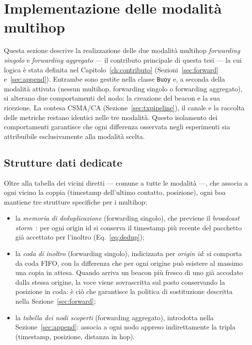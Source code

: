 \section{Implementazione delle modalit\`a multihop}
\label{sec:multihop-impl}
Questa sezione descrive la realizzazione delle due modalit\`a multihop \emph{forwarding singolo} e
\emph{forwarding aggregato} --- il contributo principale di questa tesi --- la cui logica
\`e stata definita nel Capitolo~\ref{ch:contributo} (Sezioni~\ref{sec:forward}
e~\ref{sec:append}). Entrambe sono gestite nella classe \texttt{Buoy} e, a seconda della modalit\`a attivata
(nessun multihop, forwarding singolo o forwarding aggregato),
si alterano due comportamenti del nodo: la creazione del beacon
e la sua ricezione. La contesa CSMA/CA
(Sezione~\ref{sec:txpipeline}), il canale e la raccolta delle metriche restano
identici nelle tre modalit\`a. Questo isolamento dei comportamenti garantisce che 
ogni differenza osservata negli esperimenti sia attribuibile esclusivamente
alla modalit\`a scelta.

\subsection{Strutture dati dedicate}
\label{sec:multihop-state}
Oltre alla tabella dei vicini diretti --- comune a tutte le
modalit\`a ---, che associa a ogni vicino la coppia (timestamp dell'ultimo contatto,
posizione), ogni boa mantiene tre strutture specifiche per i multihop:
\begin{itemize}[leftmargin=1.4em,nosep]
  \item la \emph{memoria di deduplicazione} (forwarding singolo), che previene il \emph{broadcast storm}~\cite{broadcaststorm}: per
  ogni origin id si conserva il timestamp pi\`u recente del pacchetto gi\`a accettato per l'inoltro (Eq.~\ref{eq:dedup});
  \item la \emph{coda di inoltro} (forwarding singolo),
  indicizzata per \emph{origin id}: si comporta da coda
  FIFO, con la differenza che per ogni origine pu\`o esistere al massimo una
  copia in attesa. Quando arriva un beacon pi\`u fresco di uno gi\`a accodato dalla
  stessa origine, la voce viene sovrascritta sul posto conservando la posizione in
  coda: \`e ci\`o che garantisce la politica di sostituzione descritta nella
  Sezione~\ref{sec:forward};
  \item la \emph{tabella dei nodi scoperti} (forwarding aggregato), introdotta nella
  Sezione~\ref{sec:append}: associa a ogni nodo appreso
  indirettamente la tripla (timestamp, posizione, distanza in hop).
\end{itemize}

